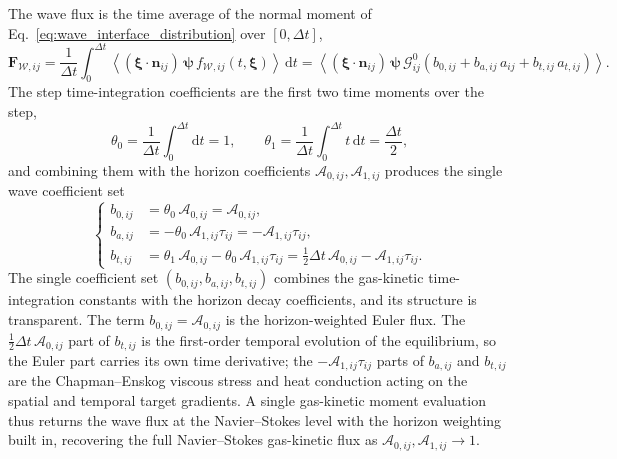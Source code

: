 \documentclass[preprint,12pt]{elsarticle}
\begin{document}
The wave flux is the time average of the normal moment of Eq.~\eqref{eq:wave_interface_distribution} over $[0,\Delta t]$,
\begin{equation}\label{eq:wave_flux_algorithm}
    \mathbf F_{\mathcal{W},ij}
    =
    \frac{1}{\Delta t}\int_0^{\Delta t}
    \left\langle (\boldsymbol{\xi}\cdot\boldsymbol{n}_{ij})\,\boldsymbol{\psi}\,f_{\mathcal{W},ij}(t,\boldsymbol{\xi}) \right\rangle\,\mathrm{d} t
    =
    \left\langle (\boldsymbol{\xi}\cdot\boldsymbol{n}_{ij})\,\boldsymbol{\psi}\,
    \mathcal{G}_{ij}^{0}\left(
    b_{0,ij}+b_{a,ij}\,a_{ij}+b_{t,ij}\,a_{t,ij}
    \right) \right\rangle .
\end{equation}
The step time-integration coefficients are the first two time moments over the step,
\begin{equation}\label{eq:gks_time_coeffs}
    \theta_0=\frac{1}{\Delta t}\int_0^{\Delta t}\mathrm{d} t=1,
    \qquad
    \theta_1=\frac{1}{\Delta t}\int_0^{\Delta t}t\,\mathrm{d} t=\frac{\Delta t}{2},
\end{equation}
and combining them with the horizon coefficients $\mathcal A_{0,ij},\mathcal A_{1,ij}$ produces the single wave coefficient set
\begin{equation}\label{eq:wave_combined_coeffs}
\left\{
\begin{aligned}
    b_{0,ij}&=\theta_0\,\mathcal A_{0,ij}=\mathcal A_{0,ij},\\
    b_{a,ij}&=-\theta_0\,\mathcal A_{1,ij}\tau_{ij}=-\mathcal A_{1,ij}\tau_{ij},\\
    b_{t,ij}&=\theta_1\,\mathcal A_{0,ij}-\theta_0\,\mathcal A_{1,ij}\tau_{ij}
    =\tfrac12\Delta t\,\mathcal A_{0,ij}-\mathcal A_{1,ij}\tau_{ij}.
\end{aligned}
\right.
\end{equation}
The single coefficient set $(b_{0,ij},b_{a,ij},b_{t,ij})$ combines the gas-kinetic time-integration constants with the horizon decay coefficients, and its structure is transparent. The term $b_{0,ij}=\mathcal A_{0,ij}$ is the horizon-weighted Euler flux. The $\tfrac12\Delta t\,\mathcal A_{0,ij}$ part of $b_{t,ij}$ is the first-order temporal evolution of the equilibrium, so the Euler part carries its own time derivative; the $-\mathcal A_{1,ij}\tau_{ij}$ parts of $b_{a,ij}$ and $b_{t,ij}$ are the Chapman--Enskog viscous stress and heat conduction acting on the spatial and temporal target gradients. A single gas-kinetic moment evaluation thus returns the wave flux at the Navier--Stokes level with the horizon weighting built in, recovering the full Navier--Stokes gas-kinetic flux as $\mathcal A_{0,ij},\mathcal A_{1,ij}\to1$.
\end{document}

